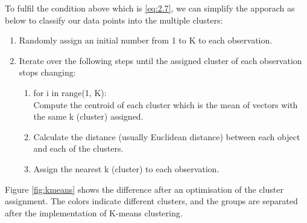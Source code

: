 \documentclass[11pt]{article} %
\theoremstyle{plain}
\theoremstyle{definition}
\begin{document}
To fulfil the condition above which is \eqref{eq:2.7}, we can simplify the apporach as below to classify our data points into the multiple clusters\cite{james/itsl:2009}:
{
  \begin{enumerate}
    \item Randomly assign an initial number from 1 to K to each observation.
    \item Iterate over the following steps until the assigned cluster of each observation stops changing:
    \begin{enumerate}
      \item for i in range(1, K): \\
      Compute the centroid of each cluster which is the mean of vectors with the same k (cluster) assigned.
      \item Calculate the distance (usually Euclidean distance) between each object and each of the clusters.
      \item  Assign the nearest k (cluster) to each observation.
    \end{enumerate}
  \end{enumerate}
}
Figure \ref{fig:kmeans} shows the difference after an optimisation of the cluster assignment. The colors indicate different clusters, and the groups are separated after the implementation of K-means clustering.
\end{document}
